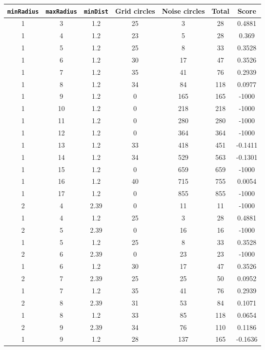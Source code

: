 \documentclass[letterpaper, 12pt]{article}
\begin{document}
\begin{longtable}{|c|c|c|c|c|c|c|}
\hline
\textbf{\texttt{minRadius}} & \textbf{\texttt{maxRadius}} & \textbf{\texttt{minDist}} & \textbf{Grid circles} & \textbf{Noise circles} & \textbf{Total} & \textbf{Score} \\
\hline
1 & 3 & 1.2 & 25 & 3 & 28 & 0.4881 \\
\hline
1 & 4 & 1.2 & 23 & 5 & 28 & 0.369 \\
\hline
1 & 5 & 1.2 & 25 & 8 & 33 & 0.3528 \\
\hline
1 & 6 & 1.2 & 30 & 17 & 47 & 0.3526 \\
\hline
1 & 7 & 1.2 & 35 & 41 & 76 & 0.2939 \\
\hline
1 & 8 & 1.2 & 34 & 84 & 118 & 0.0977 \\
\hline
1 & 9 & 1.2 & 0 & 165 & 165 & -1000 \\
\hline
1 & 10 & 1.2 & 0 & 218 & 218 & -1000 \\
\hline
1 & 11 & 1.2 & 0 & 280 & 280 & -1000 \\
\hline
1 & 12 & 1.2 & 0 & 364 & 364 & -1000 \\
\hline
1 & 13 & 1.2 & 33 & 418 & 451 & -0.1411 \\
\hline
1 & 14 & 1.2 & 34 & 529 & 563 & -0.1301 \\
\hline
1 & 15 & 1.2 & 0 & 659 & 659 & -1000 \\
\hline
1 & 16 & 1.2 & 40 & 715 & 755 & 0.0054 \\
\hline
1 & 17 & 1.2 & 0 & 855 & 855 & -1000 \\
\hline
2 & 4 & 2.39 & 0 & 11 & 11 & -1000 \\
\hline
1 & 4 & 1.2 & 25 & 3 & 28 & 0.4881 \\
\hline
2 & 5 & 2.39 & 0 & 16 & 16 & -1000 \\
\hline
1 & 5 & 1.2 & 25 & 8 & 33 & 0.3528 \\
\hline
2 & 6 & 2.39 & 0 & 23 & 23 & -1000 \\
\hline
1 & 6 & 1.2 & 30 & 17 & 47 & 0.3526 \\
\hline
2 & 7 & 2.39 & 25 & 25 & 50 & 0.0952 \\
\hline
1 & 7 & 1.2 & 35 & 41 & 76 & 0.2939 \\
\hline
2 & 8 & 2.39 & 31 & 53 & 84 & 0.1071 \\
\hline
1 & 8 & 1.2 & 33 & 85 & 118 & 0.0654 \\
\hline
2 & 9 & 2.39 & 34 & 76 & 110 & 0.1186 \\
\hline
1 & 9 & 1.2 & 28 & 137 & 165 & -0.1636 \\

\end{longtable}
\end{document}
